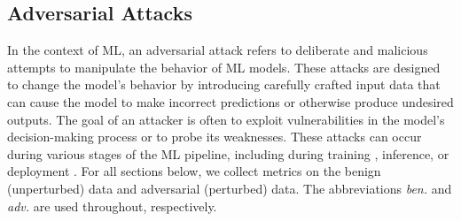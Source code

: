 

\subsection{Adversarial Attacks}

In the context of ML, an adversarial attack refers to deliberate and malicious attempts to manipulate the behavior of ML models. These attacks are designed to change the model's behavior by introducing carefully crafted input data that can cause the model to make incorrect predictions or otherwise produce undesired outputs.
The goal of an attacker is often to exploit vulnerabilities in the model's decision-making process or to probe its weaknesses. These attacks can occur during various stages of the ML pipeline, including during training \citep{biggio_poisoning_2013}, inference\citep{biggio_evasion_2013}, or deployment \citep{santos2021universal}. For all sections below, we collect metrics on the benign (unperturbed) data and adversarial (perturbed) data. The abbreviations \textit{ben.} and \textit{adv.} are used throughout, respectively.


